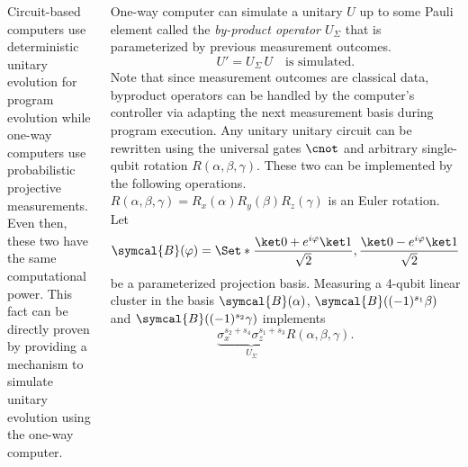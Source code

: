 \documentclass{sintefposter}
\begin{document}
\begin{columns}
{  Circuit-based computers use deterministic unitary evolution for program evolution while one-way computers use probabilistic projective measurements. Even then, these two have the same computational power. This fact can be directly proven by providing a mechanism to simulate unitary evolution using the one-way computer. \vspace{\baselineskip}

  One-way computer can simulate a unitary \(U\) up to some Pauli element called the \emph{by-product operator \(U_\Sigma\)}\cite{russendorf2003} that is parameterized by previous measurement outcomes.
  \begin{equation}
    U' = U_\Sigma\,U \quad \text{is simulated.}
  \end{equation}
  Note that since measurement outcomes are classical data, byproduct operators can be handled by the computer's controller via adapting the next measurement basis during program execution. Any unitary unitary circuit can be rewritten using the universal gates \(\cnot\) and arbitrary single-qubit rotation \(R(\alpha, \beta, \gamma)\)\cite{Nielsen2009}. These two can be implemented by the following operations. \(R(\alpha, \beta, \gamma) = R_x(\alpha) R_y(\beta) R_z(\gamma)\) is an Euler rotation. Let
  \begin{equation}
    \symcal{B}(\varphi) = \Set*{\frac{\ket0 + e^{i\varphi}\ket1}{\sqrt2}, \frac{\ket0 - e^{i\varphi}\ket1}{\sqrt2}}
  \end{equation}
  be a parameterized projection basis. Measuring a 4-qubit linear cluster in the basis \(\symcal{B}(\alpha)\), \(\symcal{B}((-1)^{s_1}\beta)\) and \(\symcal{B}((-1)^{s_2}\gamma)\) implements 
  \begin{equation}
    \underbrace{\sigma_x^{s_2+s_4}\sigma_z^{s_1+s_3}}_{U_\Sigma}R(\alpha, \beta, \gamma).
  \end{equation} 
}





\end{columns}
\end{document}
